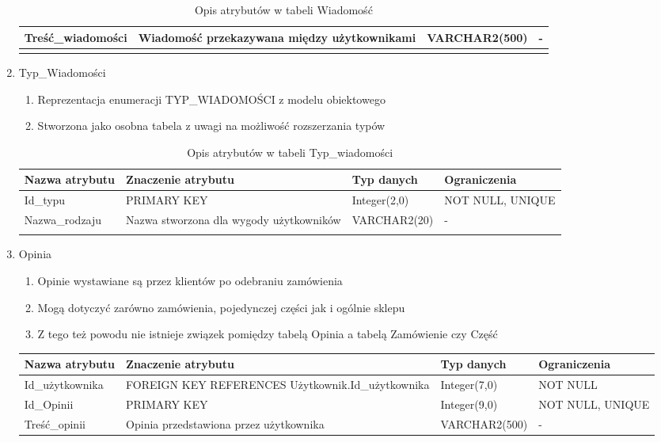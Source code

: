 \begin{enumerate}
{\begin{longtable}{|p{3.3cm}|p{5cm}|p{2.6cm}|p{2.5cm}|}
  	\\
  	\hline
  	Treść\_wiadomości & Wiadomość przekazywana między użytkownikami &
  	VARCHAR2(500) & -
  	\\
  	\hline
	\caption{Opis atrybutów w tabeli Wiadomość}
	\end{longtable}}
  \item Typ\_Wiadomości
  	\begin{enumerate}
  	  \item Reprezentacja enumeracji TYP\_WIADOMOŚCI z modelu obiektowego
  	  \item Stworzona jako osobna tabela z uwagi na możliwość rozszerzania typów 
  	\end{enumerate}
  	{\footnotesize
  	\begin{longtable}{|p{3cm}|p{5cm}|p{2.5cm}|p{2.5cm}|}
  	\hline
  	\textbf{Nazwa atrybutu} & \textbf{Znaczenie atrybutu} & \textbf{Typ danych} &
  	\textbf{Ograniczenia} \\
  	\hline
  	Id\_typu & PRIMARY KEY & Integer(2,0) & NOT NULL, UNIQUE  \\
  	\hline
  	Nazwa\_rodzaju & Nazwa stworzona dla wygody użytkowników & VARCHAR2(20) &
  	-
  	\\
  	\hline
	\caption{Opis atrybutów w tabeli Typ\_wiadomości}
	\end{longtable}}
  \item Opinia
  	\begin{enumerate}
  	  \item Opinie wystawiane są przez klientów po odebraniu zamówienia
  	  \item Mogą dotyczyć zarówno zamówienia, pojedynczej części jak i ogólnie
  	  sklepu
  	  \item Z tego też powodu nie istnieje związek pomiędzy tabelą Opinia a
  	  tabelą Zamówienie czy Część
  	\end{enumerate}
  	{\footnotesize
  	\begin{longtable}{|p{3cm}|p{5cm}|p{2.5cm}|p{2.5cm}|}
  	\hline
  	\textbf{Nazwa atrybutu} & \textbf{Znaczenie atrybutu} & \textbf{Typ danych} &
  	\textbf{Ograniczenia} \\
  	\hline
  	Id\_użytkownika & FOREIGN KEY REFERENCES Użytkownik.Id\_użytkownika &
  	Integer(7,0) & NOT NULL
  	\\
  	\hline
  	Id\_Opinii & PRIMARY KEY & Integer(9,0) & NOT NULL, UNIQUE  \\
  	\hline
  	Treść\_opinii & Opinia przedstawiona przez użytkownika & VARCHAR2(500) & - \\

\end{longtable}}
\end{enumerate}
